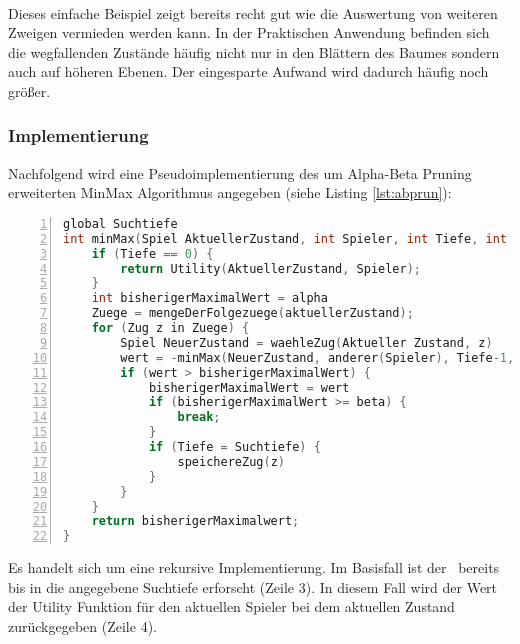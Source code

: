 \paragraph{}  
Dieses einfache Beispiel zeigt bereits recht gut wie die Auswertung von weiteren Zweigen vermieden werden kann. In der Praktischen Anwendung befinden sich die wegfallenden Zustände häufig nicht nur in den Blättern des Baumes sondern auch auf höheren Ebenen. Der eingesparte Aufwand wird dadurch häufig noch größer.  

\subsubsection{Implementierung}
Nachfolgend wird eine Pseudoimplementierung des um Alpha-Beta Pruning erweiterten MinMax Algorithmus angegeben (siehe Listing \ref{lst:abprun}):
\begin{footnotesize}
\begin{lstlisting}[caption = {Pseudoimplementierung von Alpha-Beta Pruning}, language = cpp, captionpos = t , numbers=left, label={lst:abprun}]
global Suchtiefe
int minMax(Spiel AktuellerZustand, int Spieler, int Tiefe, int alpha, int beta) {
	if (Tiefe == 0) {
		return Utility(AktuellerZustand, Spieler);	
	}
	int bisherigerMaximalWert = alpha
	Zuege = mengeDerFolgezuege(aktuellerZustand);
	for (Zug z in Zuege) {
		Spiel NeuerZustand = waehleZug(Aktueller Zustand, z)
		wert = -minMax(NeuerZustand, anderer(Spieler), Tiefe-1, -beta, -bisherigerMaximalWert)
		if (wert > bisherigerMaximalWert) {
			bisherigerMaximalWert = wert
			if (bisherigerMaximalWert >= beta) {
				break;
			}
			if (Tiefe = Suchtiefe) {
				speichereZug(z)
			}
		}
	}
	return bisherigerMaximalwert;		
} 
\end{lstlisting}
\end{footnotesize}
Es handelt sich um eine rekursive Implementierung. Im Basisfall ist der \gtree\ bereits bis in die angegebene Suchtiefe erforscht (Zeile 3). In diesem Fall wird der Wert der Utility Funktion für den aktuellen Spieler bei dem aktuellen Zustand zurückgegeben (Zeile 4).

